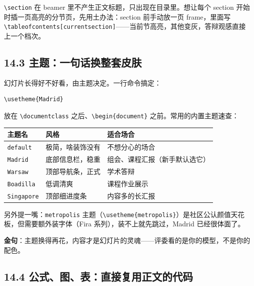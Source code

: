 \texttt{\textbackslash{}section} 在 beamer 里不产生正文标题，只出现在目录里。想让每个 section 开始时插一页高亮的分节页，先用土办法：section 前手动放一页 frame，里面写 \texttt{\textbackslash{}tableofcontents[currentsection]}——当前节高亮，其他变灰，答辩观感直接上一个档次。

\subsection*{14.3 主题：一句话换整套皮肤}

幻灯片长得好不好看，由主题决定。一行命令搞定：

\begin{lstlisting}
\usetheme{Madrid}
\end{lstlisting}

放在 \texttt{\textbackslash{}documentclass} 之后、\texttt{\textbackslash{}begin\{document\}} 之前。常用的内置主题速查：

\begin{table}[htbp]
\centering
\small
\begin{tabularx}{\linewidth}{@{}*{3}{>{\raggedright\arraybackslash}X}@{}}
\toprule
\textbf{主题名} & \textbf{风格} & \textbf{适合场合} \\
\midrule
\texttt{default} & 极简，啥装饰没有 & 不想分心的场合 \\
\texttt{Madrid} & 底部信息栏，稳重 & 组会、课程汇报（新手默认选它） \\
\texttt{Warsaw} & 顶部导航条，正式 & 学术答辩 \\
\texttt{Boadilla} & 低调清爽 & 课程作业展示 \\
\texttt{Singapore} & 顶部细进度条 & 内容多的长汇报 \\
\bottomrule
\end{tabularx}
\end{table}

另外提一嘴：\texttt{metropolis} 主题（\texttt{\textbackslash{}usetheme\{metropolis\}}）是社区公认颜值天花板，但需要额外装字体（Fira 系列），装不上就先跳过，Madrid 已经很体面了。

\begin{notebox}
\textbf{金句}：主题换得再花，内容才是幻灯片的灵魂——评委看的是你的模型，不是你的配色。
\end{notebox}

\subsection*{14.4 公式、图、表：直接复用正文的代码}

